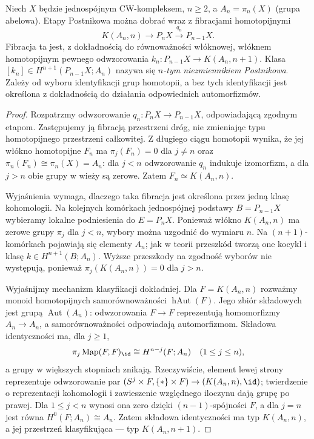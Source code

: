 \begin{twierdzenie}
\label{thm:postnikov-k-v7}
Niech $X$ będzie jednospójnym CW-kompleksem, $n\ge2$,
a $A_n=\pi_n(X)$ (grupa abelowa). Etapy Postnikowa
można dobrać wraz z fibracjami homotopijnymi
\[
K(A_n,n)\longrightarrow P_nX\xrightarrow{q_n}P_{n-1}X.
\]
Fibracja ta jest, z dokładnością do równoważności
włóknowej, włóknem homotopijnym pewnego odwzorowania
\(k_n:P_{n-1}X\to K(A_n,n+1)\).
Klasa $[k_n]\in H^{n+1}(P_{n-1}X;A_n)$
nazywa się \emph{$n$-tym niezmiennikiem Postnikowa}.
Zależy od wyboru identyfikacji grup homotopii,
a bez tych identyfikacji jest określona z dokładnością
do działania odpowiednich automorfizmów.
\end{twierdzenie}
\begin{proof}
Rozpatrzmy odwzorowanie $q_n:P_nX\to P_{n-1}X$,
odpowiadającą zgodnym etapom. Zastępujemy ją fibracją
przestrzeni dróg, nie zmieniając typu homotopijnego
przestrzeni całkowitej. Z długiego ciągu homotopii
wynika, że jej włókno homotopijne $F_n$ ma
$\pi_j(F_n)=0$ dla $j\ne n$ oraz
$\pi_n(F_n)\cong\pi_n(X)=A_n$: dla $j<n$
odwzorowanie $q_n$ indukuje izomorfizm, a dla $j>n$
obie grupy w wieży są zerowe. Zatem
$F_n\simeq K(A_n,n)$.

Wyjaśnienia wymaga, dlaczego taka fibracja jest określona
przez jedną klasę kohomologii. Na kolejnych komórkach
jednospójnej podstawy $B=P_{n-1}X$ wybieramy lokalne
podniesienia do $E=P_nX$. Ponieważ włókno
$K(A_n,n)$ ma zerowe grupy $\pi_j$ dla $j<n$,
wybory można uzgodnić do wymiaru $n$. Na
$(n+1)$-komórkach pojawiają się elementy $A_n$;
jak w teorii przeszkód tworzą one kocykl i klasę
$k\in H^{n+1}(B;A_n)$. Wyższe przeszkody
na zgodność wyborów nie występują, ponieważ
$\pi_j(K(A_n,n))=0$ dla $j>n$.

Wyjaśnijmy mechanizm klasyfikacji dokładniej.
Dla $F=K(A_n,n)$ rozważmy monoid homotopijnych
samorównoważności $\operatorname{hAut}(F)$.
Jego zbiór składowych jest grupą
$\operatorname{Aut}(A_n)$: odwzorowania $F\to F$
reprezentują homomorfizmy $A_n\to A_n$, a
samorównoważności odpowiadają automorfizmom.
Składowa identyczności ma, dla $j\ge1$,
\[
 \pi_j\operatorname{Map}(F,F)_{\id}
 \cong H^{n-j}(F;A_n)\quad(1\le j\le n),
\]
a grupy w większych stopniach znikają.
Rzeczywiście, element lewej strony reprezentuje
odwzorowanie par $(S^j\times F,\{*\}\times F)\to
(K(A_n,n),\id)$; twierdzenie o reprezentacji
kohomologii i zawieszenie względnego iloczynu
dają grupę po prawej. Dla $1\le j<n$
wynosi ona zero dzięki $(n-1)$-spójności $F$,
a dla $j=n$ jest równa
$H^0(F;A_n)\cong A_n$. Zatem składowa
identyczności ma typ $K(A_n,n)$, a jej
przestrzeń klasyfikująca --- typ $K(A_n,n+1)$.


\end{proof}
